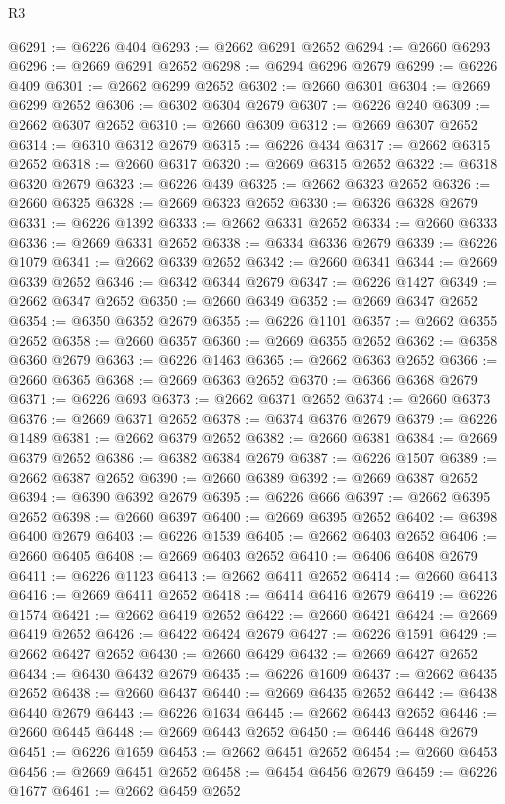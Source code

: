 \begin{lexlean}{R3}
\begin{coremodule}
@6291 := @6226 @404
@6293 := @2662 @6291 @2652
@6294 := @2660 @6293
@6296 := @2669 @6291 @2652
@6298 := @6294 @6296 @2679
@6299 := @6226 @409
@6301 := @2662 @6299 @2652
@6302 := @2660 @6301
@6304 := @2669 @6299 @2652
@6306 := @6302 @6304 @2679
@6307 := @6226 @240
@6309 := @2662 @6307 @2652
@6310 := @2660 @6309
@6312 := @2669 @6307 @2652
@6314 := @6310 @6312 @2679
@6315 := @6226 @434
@6317 := @2662 @6315 @2652
@6318 := @2660 @6317
@6320 := @2669 @6315 @2652
@6322 := @6318 @6320 @2679
@6323 := @6226 @439
@6325 := @2662 @6323 @2652
@6326 := @2660 @6325
@6328 := @2669 @6323 @2652
@6330 := @6326 @6328 @2679
@6331 := @6226 @1392
@6333 := @2662 @6331 @2652
@6334 := @2660 @6333
@6336 := @2669 @6331 @2652
@6338 := @6334 @6336 @2679
@6339 := @6226 @1079
@6341 := @2662 @6339 @2652
@6342 := @2660 @6341
@6344 := @2669 @6339 @2652
@6346 := @6342 @6344 @2679
@6347 := @6226 @1427
@6349 := @2662 @6347 @2652
@6350 := @2660 @6349
@6352 := @2669 @6347 @2652
@6354 := @6350 @6352 @2679
@6355 := @6226 @1101
@6357 := @2662 @6355 @2652
@6358 := @2660 @6357
@6360 := @2669 @6355 @2652
@6362 := @6358 @6360 @2679
@6363 := @6226 @1463
@6365 := @2662 @6363 @2652
@6366 := @2660 @6365
@6368 := @2669 @6363 @2652
@6370 := @6366 @6368 @2679
@6371 := @6226 @693
@6373 := @2662 @6371 @2652
@6374 := @2660 @6373
@6376 := @2669 @6371 @2652
@6378 := @6374 @6376 @2679
@6379 := @6226 @1489
@6381 := @2662 @6379 @2652
@6382 := @2660 @6381
@6384 := @2669 @6379 @2652
@6386 := @6382 @6384 @2679
@6387 := @6226 @1507
@6389 := @2662 @6387 @2652
@6390 := @2660 @6389
@6392 := @2669 @6387 @2652
@6394 := @6390 @6392 @2679
@6395 := @6226 @666
@6397 := @2662 @6395 @2652
@6398 := @2660 @6397
@6400 := @2669 @6395 @2652
@6402 := @6398 @6400 @2679
@6403 := @6226 @1539
@6405 := @2662 @6403 @2652
@6406 := @2660 @6405
@6408 := @2669 @6403 @2652
@6410 := @6406 @6408 @2679
@6411 := @6226 @1123
@6413 := @2662 @6411 @2652
@6414 := @2660 @6413
@6416 := @2669 @6411 @2652
@6418 := @6414 @6416 @2679
@6419 := @6226 @1574
@6421 := @2662 @6419 @2652
@6422 := @2660 @6421
@6424 := @2669 @6419 @2652
@6426 := @6422 @6424 @2679
@6427 := @6226 @1591
@6429 := @2662 @6427 @2652
@6430 := @2660 @6429
@6432 := @2669 @6427 @2652
@6434 := @6430 @6432 @2679
@6435 := @6226 @1609
@6437 := @2662 @6435 @2652
@6438 := @2660 @6437
@6440 := @2669 @6435 @2652
@6442 := @6438 @6440 @2679
@6443 := @6226 @1634
@6445 := @2662 @6443 @2652
@6446 := @2660 @6445
@6448 := @2669 @6443 @2652
@6450 := @6446 @6448 @2679
@6451 := @6226 @1659
@6453 := @2662 @6451 @2652
@6454 := @2660 @6453
@6456 := @2669 @6451 @2652
@6458 := @6454 @6456 @2679
@6459 := @6226 @1677
@6461 := @2662 @6459 @2652

\end{coremodule}
\end{lexlean}
